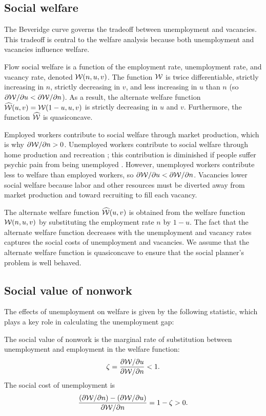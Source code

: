 \documentclass[letterpaper,12pt,leqno]{article}
\def\W{\wh{\Wc}}
\begin{document}
\subsection{Social welfare}

The Beveridge curve governs the tradeoff between unemployment and vacancies. This  tradeoff is central to the welfare analysis because both unemployment and vacancies influence welfare.

\begin{assumption}\label{a:w} Flow social welfare is a function of the employment rate, unemployment rate, and vacancy rate, denoted $\mathcal{W}(n,u,v)$. The function $\mathcal{W}$ is twice differentiable, strictly increasing in $n$, strictly decreasing in $v$, and less increasing in $u$ than $n$ (so $\partial \mathcal{W}/\partial u<\partial \mathcal{W}/\partial n$). As a result, the alternate welfare function $\W(u,v) = \Wc(1-u,u,v)$ is strictly decreasing in $u$ and $v$. Furthermore, the function $\W$ is quasiconcave.\end{assumption}

Employed workers contribute to social welfare through market production, which is why $\partial \mathcal{W}/\partial n>0$. Unemployed workers contribute to social welfare through home production and recreation ; this contribution is diminished if people suffer psychic pain from being unemployed . However, unemployed workers contribute less to welfare than employed workers, so $\partial \mathcal{W}/\partial u<\partial \mathcal{W}/\partial n$. Vacancies lower social welfare because labor and other resources must be diverted away from market production and toward recruiting to fill each vacancy. 

The alternate welfare function $\W(u,v)$ is obtained from the welfare function $\mathcal{W}(n,u,v)$ by substituting the employment rate $n$ by $1-u$. The fact that the alternate welfare function decreases with the unemployment and vacancy rates captures the social costs of unemployment and vacancies. We assume that the alternate welfare function is quasiconcave to ensure that the social planner's problem is well behaved.

\subsection{Social value of nonwork} 

The effects of unemployment on welfare is given by the following statistic, which plays a key role in calculating the unemployment gap:

\begin{definition} The social value of nonwork is the marginal rate of substitution between unemployment and employment in the welfare function:
\begin{equation*}
\zeta = \frac{\partial \mathcal{W}/\partial u}{\partial \mathcal{W}/\partial n}<1.
\end{equation*}
The social cost of unemployment is 
\begin{equation*}
\frac{(\partial \mathcal{W}/\partial n)-(\partial \mathcal{W}/\partial u)}{\partial \mathcal{W}/\partial n} = 1 - \zeta>0.
\end{equation*}
\end{definition}
\end{document}
